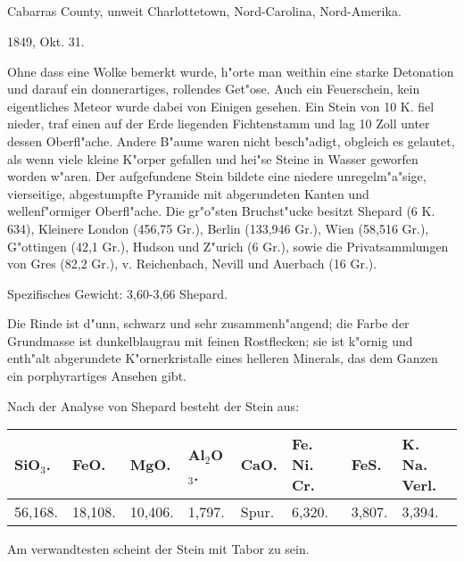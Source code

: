 \documentclass[a4paper, 11pt, oneside]{article}
\begin{document}
\subsection{}
\LARGE
\paragraph{}
Cabarras County, unweit Charlottetown, Nord-Carolina, Nord-Amerika.

1849, Okt. 31.

Ohne dass eine Wolke bemerkt wurde, h"orte man weithin eine starke Detonation und darauf ein donnerartiges, rollendes Get"ose. Auch ein Feuerschein, kein eigentliches Meteor wurde dabei von Einigen gesehen. Ein Stein von 10 K. fiel nieder, traf einen auf der Erde liegenden Fichtenstamm und lag 10 Zoll unter dessen Oberfl"ache. Andere B"aume waren nicht besch"adigt, obgleich es gelautet, als wenn viele kleine K"orper gefallen und hei"se Steine in Wasser geworfen worden w"aren. Der aufgefundene Stein bildete eine niedere unregelm"a"sige, vierseitige, abgestumpfte Pyramide mit abgerundeten Kanten und wellenf"ormiger Oberfl"ache. Die gr"o"sten Bruchst"ucke besitzt Shepard (6 K. 634), Kleinere London (456,75 Gr.), Berlin (133,946 Gr.), Wien (58,516 Gr.), G"ottingen (42,1 Gr.), Hudson und Z"urich (6 Gr.), sowie die Privatsammlungen von Gres (82,2 Gr.), v. Reichenbach, Nevill und Auerbach (16 Gr.).

Spezifisches Gewicht: 3,60-3,66 Shepard.

Die Rinde ist d"unn, schwarz und sehr zusammenh"angend; die Farbe der Grundmasse ist dunkelblaugrau mit feinen Rostflecken; sie ist k"ornig und enth"alt abgerundete K"ornerkristalle eines helleren Minerals, das dem Ganzen ein porphyrartiges Ansehen gibt.

Nach der Analyse von Shepard besteht der Stein aus:
\begin{table}[!ht]
    \centering\swabfamily\Large
    \normalsize
    \begin{tabular}{l l l l l l l l}
        SiO$_{3}$. & FeO. & MgO. & Al$_{2}$O$_{3}$. & CaO. & Fe. Ni. Cr. & FeS. & K. Na. Verl.  \\ \hline
        56,168. & 18,108. & 10,406. & 1,797. & Spur. & 6,320. & 3,807. & 3,394. \\
    \end{tabular}
\end{table}

Am verwandtesten scheint der Stein mit Tabor zu sein.
\end{document}
